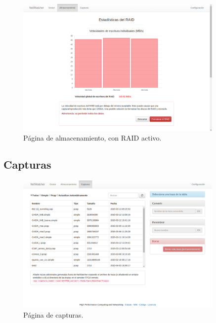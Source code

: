 \begin{itemize}
\begin{figure}[!htp]
  \centering
  \includegraphics[width=0.9\textwidth,clip=true]{graphics/capturas/almacenamiento_raid}
  \caption{Página de almacenamiento, con \gls{RAID} activo.}
  \label{fig:captura:raid}
\end{figure}
\end{itemize}


\subsection{Capturas\label{extra:manual:capturas}}

\begin{figure}[!htp]
  \centering
  \includegraphics[width=0.9\textwidth,clip=true]{graphics/capturas/capturas}
  \caption{Página de capturas.}
  \label{fig:captura:capturas}
\end{figure}

